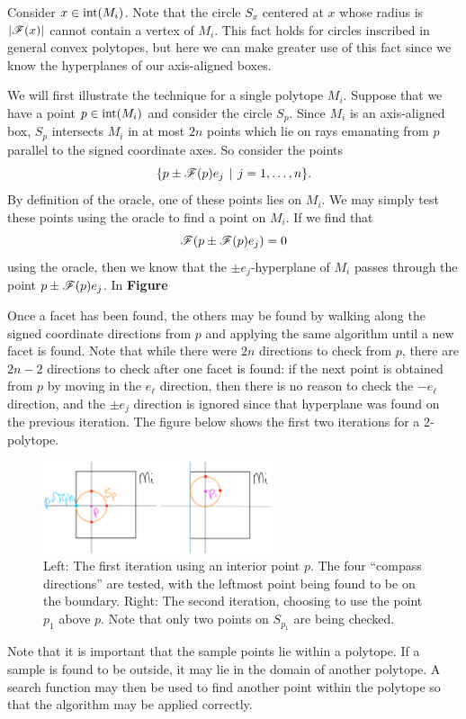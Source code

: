 \documentclass[12pt]{article}
\begin{document}
\begin{flushleft}
Consider $x\in\text{int}(M_i)$.
Note that the circle $S_x$ centered at $x$ whose radius is $\lvert\mathscr{F}(x)\rvert$ cannot contain a vertex of $M_i$.
This fact holds for circles inscribed in general convex polytopes, but here we can make greater use of this fact since we know the hyperplanes of our axis-aligned boxes.

We will first illustrate the technique for a single polytope $M_i$.
Suppose that we have a point $p\in\text{int}(M_i)$ and consider the circle $S_p$.
Since $M_i$ is an axis-aligned box, $S_p$ intersects $M_i$ in at most $2n$ points which lie on rays emanating from $p$ parallel to the signed coordinate axes.
So consider the points
\[\{p \pm \mathscr{F}(p)e_j \hspace{4pt} | \hspace{4pt} j = 1,\dots, n\}.\]
By definition of the oracle, one of these points lies on $M_i$.
We may simply test these points using the oracle to find a point on $M_i$.
If we find that
\[\mathscr{F}(p\pm\mathscr{F}(p)e_j)=0\]
using the oracle, then we know that the $\pm e_j$-hyperplane of $M_i$ passes through the point $p\pm\mathscr{F}(p)e_j$.
In \textbf{Figure}

Once a facet has been found, the others may be found by walking along the signed coordinate directions from $p$ and applying the same algorithm until a new facet is found.
Note that while there were $2n$ directions to check from $p$, there are $2n-2$ directions to check after one facet is found:
if the next point is obtained from $p$ by moving in the $e_\ell$ direction, then there is no reason to check the $-e_\ell$ direction, and the $\pm e_j$ direction is ignored since that hyperplane was found on the previous iteration.
The figure below shows the first two iterations for a 2-polytope.
\begin{figure}[H]
	\centering
	\includegraphics[width=0.6\textwidth]{single_interior.png}
	\caption{Left: The first iteration using an interior point $p$.
		The four ``compass directions'' are tested, with the leftmost point being found to be on the boundary.
		Right: The second iteration, choosing to use the point $p_1$ above $p$.
	Note that only two points on $S_{p_1}$ are being checked.}
\end{figure}

Note that it is important that the sample points lie within a polytope.
If a sample is found to be outside, it may lie in the domain of another polytope.
A search function may then be used to find another point within the polytope so that the algorithm may be applied correctly.


\end{flushleft}
\end{document}
